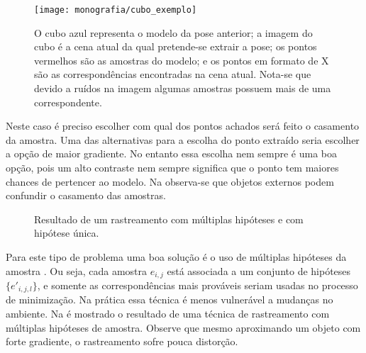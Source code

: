 \begin{figure}[ht!]
\centering
\texttt{[image: monografia/cubo\_exemplo]}
\caption{O cubo azul representa o modelo da pose anterior; a imagem do cubo é a cena atual da qual pretende-se extrair a pose; os pontos vermelhos são as amostras do modelo; e os pontos em formato de X são as correspondências encontradas na cena atual. Nota-se que devido a ruídos na imagem algumas amostras possuem mais de uma correspondente.}
\label{cubo_0}
\end{figure}

Neste caso é preciso escolher com qual dos pontos achados será feito o casamento da amostra. Uma das alternativas para a escolha do ponto extraído seria escolher a opção de maior gradiente. No entanto essa escolha nem sempre é uma boa opção, pois um alto contraste nem sempre significa que o ponto tem maiores chances de pertencer ao modelo. Na  observa-se que objetos externos podem confundir o casamento das amostras.

\begin{figure}[!ht]
	\centerline{
		\hfil
	}
	\caption{Resultado de um rastreamento com múltiplas hipóteses e com hipótese única.}
\end{figure}

Para este tipo de problema uma boa solução é o uso de múltiplas hipóteses da amostra \cite{multiplas_hipoteses}. Ou seja, cada amostra $e_{i,j}$ está associada a um conjunto de hipóteses $\{e'_{i,j,l}\}$, e somente as correspondências mais prováveis seriam usadas no processo de minimização. Na prática essa técnica é menos vulnerável a mudanças no ambiente. Na  é mostrado o resultado de uma técnica de rastreamento com múltiplas hipóteses de amostra. Observe que mesmo aproximando um objeto com forte gradiente, o rastreamento sofre pouca distorção.

